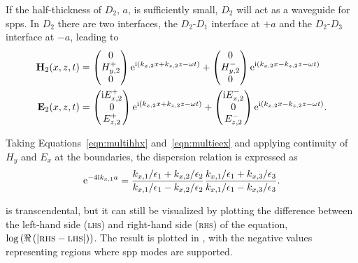 If the half-thickness of $D_2$, $a$, is sufficiently small, $D_2$ will act
as a waveguide for \glspl{spp}.  In $D_2$ there are two interfaces, the
$D_2$-$D_1$ interface at $+a$ and the $D_2$-$D_3$ interface at $-a$,
leading to
\begin{align}
\mathbf{H}_2(x,z,t) &=
\begin{pmatrix}
0\\
H^+_{y,2}\\
0
\end{pmatrix} {\mathrm{e}}^{{\mathrm{i}}(k_{x,2}x+k_{z,2}z-\omega t)}
+
\begin{pmatrix}
0\\
H^-_{y,2}\\
0
\end{pmatrix} {\mathrm{e}}^{{\mathrm{i}}(k_{x,2}x-k_{z,2}z-\omega t)} \label{eqn:multihhx} \\
\mathbf{E}_2(x,z,t) &=
\begin{pmatrix}
{\mathrm{i}} E^+_{x,2}\\
0\\
E^+_{z,2}\\
\end{pmatrix} {\mathrm{e}}^{{\mathrm{i}}(k_{x,2}x+k_{z,2}z-\omega t)}
+
\begin{pmatrix}
{\mathrm{i}} E^-_{x,2}\\
0\\
E^-_{z,2}\\
\end{pmatrix} {\mathrm{e}}^{{\mathrm{i}}(k_{x,2}x-k_{z,2}z-\omega t)}.
\label{eqn:multieex}
\end{align}

Taking Equations~\ref{eqn:multihhx} and~\ref{eqn:multieex} and applying
continuity of $H_y$ and $E_x$ at the boundaries, the dispersion relation is
expressed as
\begin{equation}
{\mathrm{e}}^{-4 {\mathrm{i}} k_{x,1} a} =
\frac{k_{x,1}/\epsilon_1 + k_{x,2}/\epsilon_2}
     {k_{x,1}/\epsilon_1 - k_{x,2}/\epsilon_2}
\frac{k_{x,1}/\epsilon_1 + k_{x,3}/\epsilon_3}
     {k_{x,1}/\epsilon_1 - k_{x,3}/\epsilon_3}.
\label{eqn:lrsppdispersion}
\end{equation}

 is transcendental, but it can still be
visualized by plotting the difference between the left-hand side (\textsc{lhs}) and
right-hand side (\textsc{rhs}) of the equation,
$\log\left(\Re\left(|\mathrm{\textsc{rhs}}-\mathrm{\textsc{lhs}}|\right)\right)$.  The result
is plotted in , with the negative
values representing regions where \gls{spp} modes are supported.

